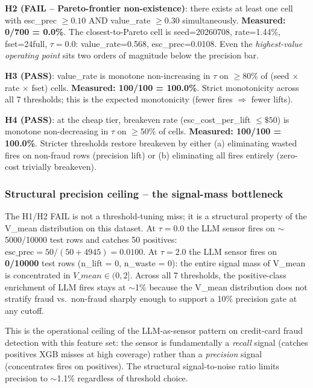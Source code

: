 \textbf{H2 (FAIL -- Pareto-frontier non-existence)}: there exists at
least one cell with esc\_prec $\geq 0.10$ AND value\_rate $\geq 0.30$
simultaneously. \textbf{Measured: 0/700 = 0.0\%}. The closest-to-Pareto
cell is seed=20260708, rate=1.44\%, fset=24full, $\tau=0.0$:
value\_rate=0.568, esc\_prec=0.0108. Even the \emph{highest-value
operating point} sits two orders of magnitude below the precision bar.

\textbf{H3 (PASS)}: value\_rate is monotone non-increasing in $\tau$ on
$\geq 80\%$ of (seed $\times$ rate $\times$ fset) cells. \textbf{Measured:
100/100 = 100.0\%}. Strict monotonicity across all 7 thresholds; this is
the expected monotonicity (fewer fires $\Rightarrow$ fewer lifts).

\textbf{H4 (PASS)}: at the cheap tier, breakeven rate (esc\_cost\_per\_lift
$\leq \$50$) is monotone non-decreasing in $\tau$ on $\geq 50\%$ of
cells. \textbf{Measured: 100/100 = 100.0\%}. Stricter thresholds restore
breakeven by either (a) eliminating wasted fires on non-fraud rows
(precision lift) or (b) eliminating all fires entirely (zero-cost
trivially breakeven).

\subsubsection{Structural precision ceiling -- the signal-mass bottleneck}
The H1/H2 FAIL is not a threshold-tuning miss; it is a structural
property of the V\_mean distribution on this dataset. At $\tau = 0.0$
the LLM sensor fires on $\sim$5000/10000 test rows and catches 50
positives: $\text{esc\_prec} = 50/(50 + 4945) = 0.0100$. At $\tau =
2.0$ the LLM sensor fires on \textbf{0/10000} test rows (n\_lift = 0,
n\_waste = 0): the entire signal mass of V\_mean is concentrated in
$V\_mean \in (0, 2]$. Across all 7 thresholds, the positive-class
enrichment of LLM fires stays at $\sim$1\% because the V\_mean
distribution does not stratify fraud vs.\ non-fraud sharply enough
to support a 10\% precision gate at any cutoff.

This is the operational ceiling of the LLM-as-sensor pattern on
credit-card fraud detection with this feature set: the sensor is
fundamentally a \emph{recall} signal (catches positives XGB misses at
high coverage) rather than a \emph{precision} signal (concentrates
fires on positives). The structural signal-to-noise ratio limits
precision to $\sim$1.1\% regardless of threshold choice.

